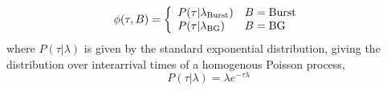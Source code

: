 \documentclass{article}
\begin{document}
\begin{equation}
  \phi(\tau, B) = \left\{
    \begin{array}{l l}
      P(\tau \vert \lambda_\mathrm{Burst})  & B = \mathrm{Burst} \\
      P(\tau \vert \lambda_\mathrm{BG})     & B = \mathrm{BG} \\
    \end{array}
  \right.
\end{equation}
where $P(\tau \vert \lambda)$ is given by the standard exponential
distribution, giving the distribution over interarrival times of a
homogenous Poisson process,
\[ P(\tau \vert \lambda) = \lambda e^{-\tau \lambda} \]
\end{document}
